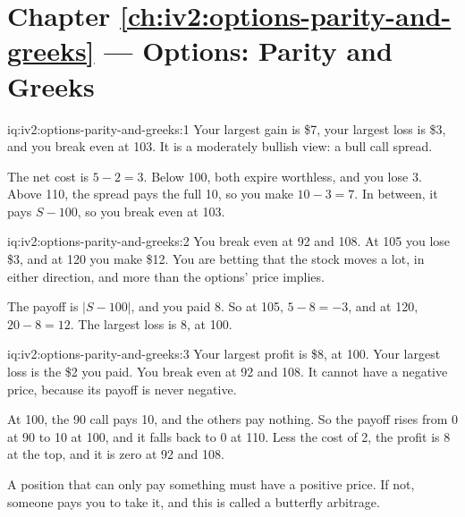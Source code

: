 \section*{Chapter \ref{ch:iv2:options-parity-and-greeks} --- Options: Parity and Greeks}

\begin{solution}{iq:iv2:options-parity-and-greeks:1}
Your largest gain is \$7, your largest loss is \$3, and you break even at 103. It is a moderately bullish view: a bull call spread.

The net cost is $5 - 2 = 3$. Below 100, both expire worthless, and you lose 3. Above 110, the spread pays the full 10, so you make $10 - 3 = 7$. In between, it pays $S - 100$, so you break even at 103.

\end{solution}

\begin{solution}{iq:iv2:options-parity-and-greeks:2}
You break even at 92 and 108. At 105 you lose \$3, and at 120 you make \$12. You are betting that the stock moves a lot, in either direction, and more than the options' price implies.

The payoff is $|S - 100|$, and you paid 8. So at 105, $5 - 8 = -3$, and at 120, $20 - 8 = 12$. The largest loss is 8, at 100.

\end{solution}

\begin{solution}{iq:iv2:options-parity-and-greeks:3}
Your largest profit is \$8, at 100. Your largest loss is the \$2 you paid. You break even at 92 and 108. It cannot have a negative price, because its payoff is never negative.

At 100, the 90 call pays 10, and the others pay nothing. So the payoff rises from 0 at 90 to 10 at 100, and it falls back to 0 at 110. Less the cost of 2, the profit is 8 at the top, and it is zero at 92 and 108.

A position that can only pay something must have a positive price. If not, someone pays you to take it, and this is called a butterfly arbitrage.

\end{solution}

